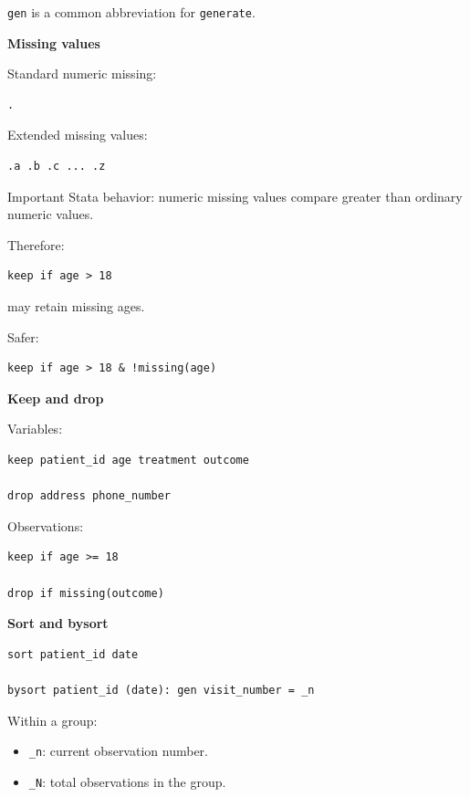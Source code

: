 \documentclass[11pt,letterpaper]{article}
\begin{document}
\texttt{gen} is a common abbreviation for \texttt{generate}.

\textbf{Missing values}

Standard numeric missing:

\begin{lstlisting}
.
\end{lstlisting}

Extended missing values:

\begin{lstlisting}
.a .b .c ... .z
\end{lstlisting}

Important Stata behavior: numeric missing values compare greater than ordinary
numeric values.

Therefore:

\begin{lstlisting}
keep if age > 18
\end{lstlisting}

may retain missing ages.

Safer:

\begin{lstlisting}
keep if age > 18 & !missing(age)
\end{lstlisting}

\textbf{Keep and drop}

Variables:

\begin{lstlisting}
keep patient_id age treatment outcome

drop address phone_number
\end{lstlisting}

Observations:

\begin{lstlisting}
keep if age >= 18

drop if missing(outcome)
\end{lstlisting}

\textbf{Sort and bysort}

\begin{lstlisting}
sort patient_id date

bysort patient_id (date): gen visit_number = _n
\end{lstlisting}

Within a group:

\begin{itemize}[leftmargin=*]
    \item \texttt{\_n}: current observation number.
    \item \texttt{\_N}: total observations in the group.
\end{itemize}
\end{document}
